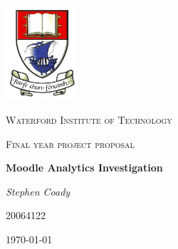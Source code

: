 \begin{titlepage}
	\centering
	\includegraphics[width=0.2\textwidth]{components/images/wit_logo}\par\vspace{1cm}
	{\scshape\LARGE Waterford Institute of Technology \par}
	\vspace{1cm}
	{\scshape\Large Final year project proposal\par}
	\vspace{1.5cm}
	{\huge\bfseries Moodle Analytics Investigation\par}
	\vspace{2cm}
	{\Large\itshape Stephen Coady\par}
	{\Large 20064122\par}

	\vfill

	{\large \today\par}
\end{titlepage}